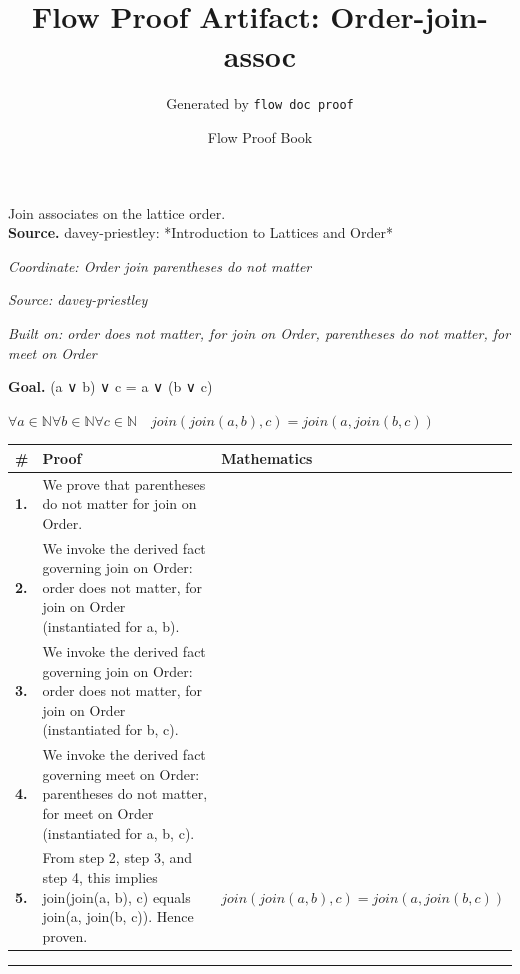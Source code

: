 \documentclass[11pt]{article}
\title{Flow Proof Artifact: Order-join-assoc}
\author{Generated by \texttt{flow doc proof}}
\date{Flow Proof Book}
\theoremstyle{definition}
\begin{document}
\maketitle
Join associates on the lattice order.\\[0.5em]
\textbf{Source.} davey-priestley: *Introduction to Lattices and Order*\\[0.5em]
\bigskip
{}\par
\smallskip\noindent\textit{Coordinate: Order \cdot join \cdot parentheses do not matter}\par
\smallskip\noindent\textit{Source: davey-priestley}\par
\smallskip\noindent\textit{Built on: order does not matter, for join on Order, parentheses do not matter, for meet on Order}\par
\medskip
\noindent\textbf{Goal.} (a ∨ b) ∨ c = a ∨ (b ∨ c)\par
\noindent$\displaystyle \forall a \in \mathbb{N} \forall b \in \mathbb{N} \forall c \in \mathbb{N}\quad join(join(a, b), c) = join(a, join(b, c))$\par
\medskip
\noindent
\begin{tabular}{@{} >{\raggedright\arraybackslash}p{} >{\raggedright\arraybackslash}p{} >{\raggedleft\arraybackslash}p{} @{}}
\textbf{\#} & \textbf{Proof} & \textbf{Mathematics} \\
\midrule
\textbf{1.} & We prove that parentheses do not matter for join on Order. & \\[0.45em]
\textbf{2.} & We invoke the derived fact governing join on Order: order does not matter, for join on Order (instantiated for a, b). & \\[0.45em]
\textbf{3.} & We invoke the derived fact governing join on Order: order does not matter, for join on Order (instantiated for b, c). & \\[0.45em]
\textbf{4.} & We invoke the derived fact governing meet on Order: parentheses do not matter, for meet on Order (instantiated for a, b, c). & \\[0.45em]
\textbf{5.} & From step 2, step 3, and step 4, this implies join(join(a, b), c) equals join(a, join(b, c)). Hence proven. & $\displaystyle join(join(a, b), c) = join(a, join(b, c))$ \\[0.45em]
\bottomrule
\end{tabular}
\label{thm:Order-join-parentheses_do_not_matter}
\par\medskip\hrule
\end{document}
